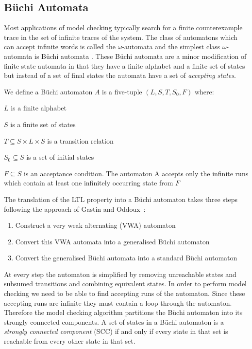 \subsection{B{\"u}chi Automata}
\newcommand{\Buchi}{B{\"u}chi\xspace}
Most applications of model checking typically search for a finite counterexample trace in the set of infinite traces of the system. The class of automatons which can accept infinite words is called the $\omega$-automata and the simplest class $\omega$-automata is \Buchi automata \cite{JB62}. These \Buchi automata are a minor modification of finite state automata in that they have a finite alphabet and a finite set of states but instead of a set of final states the automata have a set of \emph{accepting states}.
\medskip
\begin{mydef}
We define a \Buchi automaton $A$ is a five-tuple $(L, S,T,S_0, F)$ where:
\item $L$ is a finite alphabet
\item $S$ is a finite set of states
\item $T \subseteq S \times L \times S$ is a transition relation
\item $S_0 \subseteq S$ is a set of initial states 
\item $F \subseteq S$ is an acceptance condition. The automaton A accepts only the infinite runs which contain at least one infinitely occurring state from $F$
\end{mydef}

The translation of the LTL property into a \Buchi automaton takes three steps following the approach of Gastin and Oddoux~\cite{PG01}:

\begin{enumerate}
\item Construct a very weak alternating (VWA) automaton
\item Convert this VWA automata into a generalised \Buchi automaton
\item Convert the generalised \Buchi automata into a standard \Buchi automaton
\end{enumerate}

At every step the automaton is simplified by removing unreachable states and subsumed transitions and combining equivalent states. In order to perform model checking we need to be able to find accepting runs of the automaton. Since these accepting runs are infinite they must contain a loop through the automaton. Therefore the model checking algorithm partitions the \Buchi automaton into its strongly connected components. A set of states in a \Buchi automaton is a \emph{strongly connected component} (SCC) if and only if every state in that set is reachable from every other state in that set. 

